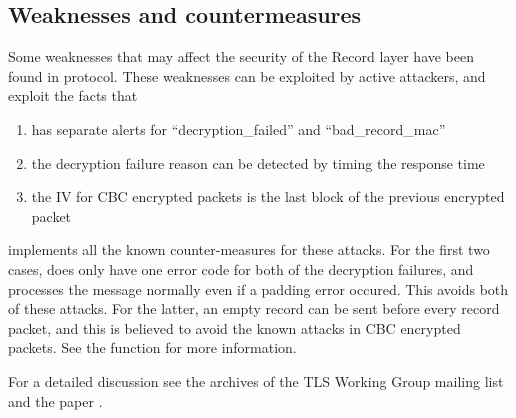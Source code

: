 \subsection*{Weaknesses and countermeasures}

Some weaknesses that may affect the security of the Record layer have been
found in \tlsI{} protocol. These weaknesses can be exploited by active attackers,
and exploit the facts that
\begin{enumerate}
\item \tls{} has separate alerts for ``decryption\_failed'' and ``bad\_record\_mac''
\item the decryption failure reason can be detected by timing the response time
\item the IV for CBC encrypted packets is the last block of the previous encrypted packet
\end{enumerate}

\gnutls{} implements all the known counter-measures for these attacks. For the first
two cases, \gnutls{} does only have one error code for both of the decryption failures,
and processes the message normally even if a padding error occured. This avoids
both of these attacks.
For the latter, an empty record can be sent before every record packet, and this is
believed to avoid the known attacks in CBC encrypted packets. See the function
for more information.

For a detailed discussion see the archives of the TLS Working Group mailing list
and the paper \cite{CBCATT}.

